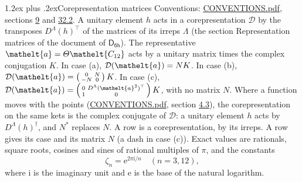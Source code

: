 \documentclass[10pt,a4paper]{article}
\makeatletter
\renewcommand\section{\@startsection{section}{1}{\z@}{-3ex plus -1ex minus -.2ex}%
  {1.2ex plus .2ex}{\normalfont\large\sffamily\bfseries\color{parttitle}}}
\numberwithin{equation}{section}
\newcommand{\eltfont}[1]{{\let\sigma\eltsigma\mathelt{#1}}}
\newcommand{\grp}[1]{\mathsf{#1}}
\newcommand{\elt}[1]{\eltfont{#1}}
\newcommand{\iunit}{\mathrm{i}}
\newcommand{\expe}{\mathrm{e}}
\newcommand{\rootunity}[1]{\zeta_{#1}}
\makeatother
\begin{document}
\section{Corepresentation matrices}\label{s:corep_matrices}
Conventions: \href{../../CONVENTIONS.pdf}{CONVENTIONS.pdf}, sections \href{../../../rotation/CONVENTIONS.pdf\#conv.9}{9} and \href{../../CONVENTIONS.pdf\#conv.32.2}{32.2}.
A unitary element $h$ acts in a corepresentation $\mathcal{D}$ by the transposes $D^{\Lambda}(h)^{\top}$ of the matrices of its irreps $\Lambda$ (the section Representation matrices of the document of \href{../../../rotation/data/pdf/D6h.pdf}{$\grp{D_{6h}}$}). The representative $\elt{a} = \varTheta\elt{C_{12}}$ acts by a unitary matrix times the complex conjugation $K$.
In case (a), $\mathcal{D}(\elt{a}) = NK$. In case (b), $\mathcal{D}(\elt{a}) = \left(\begin{smallmatrix} 0 & N \\ -N & 0 \end{smallmatrix}\right) K$. In case (c), $\mathcal{D}(\elt{a}) = \left(\begin{smallmatrix} 0 & D^{\Lambda}(\elt{a}^2)^{\top} \\ 1 & 0 \end{smallmatrix}\right) K$, with no matrix $N$.
Where a function moves with the points (\href{../../CONVENTIONS.pdf}{CONVENTIONS.pdf}, section \href{../../../rotation/CONVENTIONS.pdf\#conv.4.3}{4.3}), the corepresentation on the same kets is the complex conjugate of $\mathcal{D}$: a unitary element $h$ acts by $D^{\Lambda}(h)^{\dagger}$, and $N^{*}$ replaces $N$.
A row is a corepresentation, by its irreps. A row gives its case and its matrix $N$ (a dash in case (c)).
\leavevmode\label{n:constant.root}\label{n:index.root.order}Exact values are rationals, square roots, cosines and sines of rational multiples of $\pi$, and the constants
\begin{equation}\label{e:constants}\rootunity{n} = \expe^{2\pi\iunit/n}\quad(n = 3, 12),\end{equation}
where $\iunit$ is the imaginary unit and $\expe$ is the base of the natural logarithm.
\end{document}
